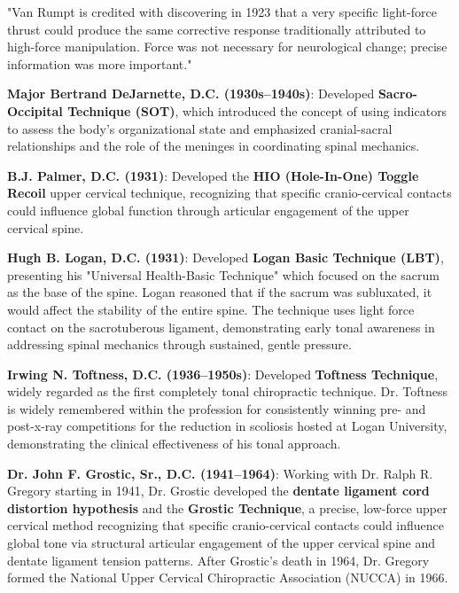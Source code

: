 \documentclass[11pt,letterpaper]{article}
\begin{document}
\begin{pullquotebox}
"Van Rumpt is credited with discovering in 1923 that a very specific light-force thrust could produce the same corrective response traditionally attributed to high-force manipulation. Force was not necessary for neurological change; precise information was more important."
\end{pullquotebox}

\textbf{Major Bertrand DeJarnette, D.C. (1930s–1940s)}: Developed \textbf{Sacro-Occipital Technique (SOT)}, which introduced the concept of using indicators to assess the body's organizational state and emphasized cranial-sacral relationships and the role of the meninges in coordinating spinal mechanics.


\textbf{B.J. Palmer, D.C. (1931)}: Developed the \textbf{HIO (Hole-In-One) Toggle Recoil} upper cervical technique, recognizing that specific cranio-cervical contacts could influence global function through articular engagement of the upper cervical spine.


\textbf{Hugh B. Logan, D.C. (1931)}: Developed \textbf{Logan Basic Technique (LBT)}, presenting his "Universal Health-Basic Technique" which focused on the sacrum as the base of the spine. Logan reasoned that if the sacrum was subluxated, it would affect the stability of the entire spine. The technique uses light force contact on the sacrotuberous ligament, demonstrating early tonal awareness in addressing spinal mechanics through sustained, gentle pressure.


\textbf{Irwing N. Toftness, D.C. (1936–1950s)}: Developed \textbf{Toftness Technique}, widely regarded as the first completely tonal chiropractic technique. Dr. Toftness is widely remembered within the profession for consistently winning pre- and post-x-ray competitions for the reduction in scoliosis hosted at Logan University, demonstrating the clinical effectiveness of his tonal approach.


\textbf{Dr. John F. Grostic, Sr., D.C. (1941–1964)}: Working with Dr. Ralph R. Gregory starting in 1941, Dr. Grostic developed the \textbf{dentate ligament cord distortion hypothesis} and the \textbf{Grostic Technique}, a precise, low-force upper cervical method recognizing that specific cranio-cervical contacts could influence global tone via structural articular engagement of the upper cervical spine and dentate ligament tension patterns. After Grostic's death in 1964, Dr. Gregory formed the National Upper Cervical Chiropractic Association (NUCCA) in 1966.
\end{document}
